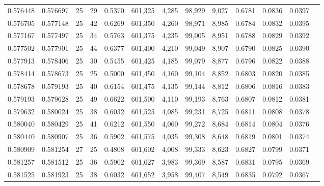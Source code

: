 \begin{tabular}{rrrrrrrrrrrrr}
0.576448 & 0.576697 &    25 &  29 &                                     0.5370 & 601,325 &   4,285 &  98,929 &   9,027 & 0.6781 & 0.0836 & 0.0397 \\
0.576705 & 0.577148 &    25 &  42 &                                     0.6269 & 601,350 &   4,260 &  98,971 &   8,985 & 0.6784 & 0.0832 & 0.0395 \\
0.577167 & 0.577497 &    25 &  34 &                                     0.5763 & 601,375 &   4,235 &  99,005 &   8,951 & 0.6788 & 0.0829 & 0.0392 \\
0.577502 & 0.577901 &    25 &  44 &                                     0.6377 & 601,400 &   4,210 &  99,049 &   8,907 & 0.6790 & 0.0825 & 0.0390 \\
0.577913 & 0.578406 &    25 &  30 &                                     0.5455 & 601,425 &   4,185 &  99,079 &   8,877 & 0.6796 & 0.0822 & 0.0388 \\
0.578414 & 0.578673 &    25 &  25 &                                     0.5000 & 601,450 &   4,160 &  99,104 &   8,852 & 0.6803 & 0.0820 & 0.0385 \\
0.578678 & 0.579193 &    25 &  40 &                                     0.6154 & 601,475 &   4,135 &  99,144 &   8,812 & 0.6806 & 0.0816 & 0.0383 \\
0.579193 & 0.579628 &    25 &  49 &                                     0.6622 & 601,500 &   4,110 &  99,193 &   8,763 & 0.6807 & 0.0812 & 0.0381 \\
0.579632 & 0.580024 &    25 &  38 &                                     0.6032 & 601,525 &   4,085 &  99,231 &   8,725 & 0.6811 & 0.0808 & 0.0378 \\
0.580040 & 0.580429 &    25 &  41 &                                     0.6212 & 601,550 &   4,060 &  99,272 &   8,684 & 0.6814 & 0.0804 & 0.0376 \\
0.580440 & 0.580907 &    25 &  36 &                                     0.5902 & 601,575 &   4,035 &  99,308 &   8,648 & 0.6819 & 0.0801 & 0.0374 \\
0.580909 & 0.581254 &    27 &  25 &                                     0.4808 & 601,602 &   4,008 &  99,333 &   8,623 & 0.6827 & 0.0799 & 0.0371 \\
0.581257 & 0.581512 &    25 &  36 &                                     0.5902 & 601,627 &   3,983 &  99,369 &   8,587 & 0.6831 & 0.0795 & 0.0369 \\
0.581525 & 0.581923 &    25 &  38 &                                     0.6032 & 601,652 &   3,958 &  99,407 &   8,549 & 0.6835 & 0.0792 & 0.0367 \\

\end{tabular}
